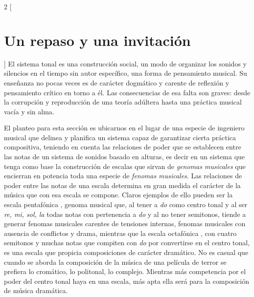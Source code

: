 \documentclass[a4paper,11pt]{article}
\begin{document}
\newpage
\begin{multicols}{2}
[\section{Un repaso y una invitación}\label{sec:repaso-invitacion}]
El sistema tonal es una construcción social, un modo de organizar los sonidos y silencios en el tiempo sin autor específico, una forma de pensamiento musical. Su enseñanza no pocas veces es de carácter dogmático y carente de reflexión y pensamiento crítico en torno a él. Las consecuencias de esa falta son graves: desde la corrupción y reproducción de una teoría adúltera hasta una práctica musical vacía y sin alma.

El planteo para esta sección es ubicarnos en el lugar de una especie de ingeniero musical que delinea y planifica un sistema capaz de garantizar cierta práctica compositiva, teniendo en cuenta las relaciones de poder que se establecen entre las notas de un sistema de sonidos basado en alturas, es decir en un sistema que tenga como base la construcción de escalas que sirvan de \emph{genomas musicales} que encierran en potencia toda una especie de \emph{fenomas musicales}. Las relaciones de poder entre las notas de una escala determina en gran medida el carácter de la música que con esa escala se compone. Claros ejemplos de ello pueden ser la escala pentafónica \hbox{,} genoma musical que, al tener a \emph{do} como centro tonal y al ser \emph{re, mi, sol, la} todas notas con pertenencia a \emph{do} y al no tener semitonos, tiende a generar fenomas musicales carentes de tensiones internas, fenomas musicales con ausencia de conflictos y drama, mientras que la escala octafónica \hbox{,} con cuatro semitonos y muchas notas que compiten con \emph{do} por convertirse en el centro tonal, es una escala que propicia composiciones de carácter dramático. No es casual que cuando se aborda la composición de la música de una película de terror se prefiera lo cromático, lo politonal, lo complejo. Mientras más competencia por el poder del centro tonal haya en una escala, más apta ella será para la composición de música dramática.


\end{multicols}
\end{document}

